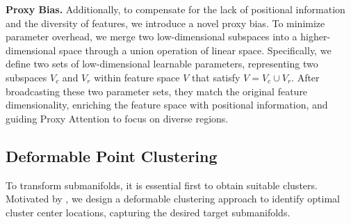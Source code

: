 \noindent \textbf{Proxy Bias.}
Additionally, to compensate for the lack of positional information and the diversity of features, we introduce a novel proxy bias. To minimize parameter overhead, we merge two low-dimensional subspaces into a higher-dimensional space through a union operation of linear space. Specifically, we define two sets of low-dimensional learnable parameters, representing two subspaces $V_c$ and $V_r$ within feature space $V$ that satisfy $V = V_c \cup V_r$. After broadcasting these two parameter sets, they match the original feature dimensionality, enriching the feature space with positional information, and guiding Proxy Attention to focus on diverse regions.

\subsection{Deformable Point Clustering}
\label{sub:deform}
To transform submanifolds, it is essential first to obtain suitable 
 clusters. Motivated by \cite{deformabledetr,dai2017deformable,xia2022vision}, we design a deformable clustering approach to identify optimal cluster center locations, capturing the desired target submanifolds.

